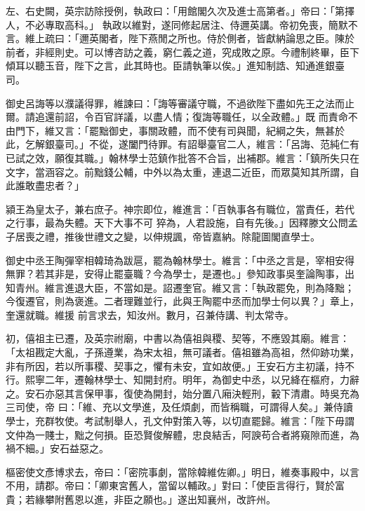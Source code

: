 \begin{pinyinscope}
 左、右史闕，英宗訪除授例，執政曰：「用館閣久次及進士高第者。」帝曰：「第擇人，不必專取高科。」
 執政以維對，遂同修起居注、侍邇英講。帝初免喪，簡默不言。維上疏曰：「邇英閣者，陛下燕閒之所也。侍於側者，皆獻納論思之臣。陳於前者，非經則史。可以博咨訪之義，窮仁義之道，究成敗之原。今禮制終畢，臣下傾耳以聽玉音，陛下之言，此其時也。臣請執筆以俟。」進知制誥、知通進銀臺司。



 御史呂誨等以濮議得罪，維諫曰：「誨等審議守職，不過欲陛下盡如先王之法而止爾。請追還前詔，令百官詳議，以盡人情；復誨等職任，以全政體。」既
 而責命不由門下，維又言：「罷黜御史，事關政體，而不使有司與聞，紀綱之失，無甚於此，乞解銀臺司。」不從，遂闔門待罪。有詔舉臺官二人，維言：「呂誨、范純仁有已試之效，願復其職。」翰林學士范鎮作批答不合旨，出補郡。維言：「鎮所失只在文字，當涵容之。前黜錢公輔，中外以為太重，連退二近臣，而眾莫知其所謂，自此誰敢盡忠者？」



 潁王為皇太子，兼右庶子。神宗即位，維進言：「百執事各有職位，當責任，若代之行事，最為失體。天下大事不可
 猝為，人君設施，自有先後。」因釋滕文公問孟子居喪之禮，推後世禮文之變，以伸規諷，帝皆嘉納。除龍圖閣直學士。



 御史中丞王陶彈宰相韓琦為跋扈，罷為翰林學士。維言：「中丞之言是，宰相安得無罪？若其非是，安得止罷臺職？今為學士，是遷也。」參知政事吳奎論陶事，出知青州。維言進退大臣，不當如是。詔遷奎官。維又言：「執政罷免，則為降黜；今復遷官，則為褒進。二者理難並行，此與王陶罷中丞而加學士何以異？」章上，奎還就職。維援
 前言求去，知汝州。數月，召兼侍講、判太常寺。



 初，僖祖主已遷，及英宗祔廟，中書以為僖祖與稷、契等，不應毀其廟。維言：「太祖戡定大亂，子孫遵業，為宋太祖，無可議者。僖祖雖為高祖，然仰跡功業，非有所因，若以所事稷、契事之，懼有未安，宜如故便。」王安石方主初議，持不行。熙寧二年，遷翰林學士、知開封府。明年，為御史中丞，以兄絳在樞府，力辭之。安石亦惡其言保甲事，復使為開封，始分置八廂決輕刑，轂下清肅。時吳充為三司使，帝
 曰：「維、充以文學進，及任煩劇，而皆稱職，可謂得人矣。」兼侍讀學士，充群牧使。考試制舉人，孔文仲對策入等，以切直罷歸。維言：「陛下毋謂文仲為一賤士，黜之何損。臣恐賢俊解體，忠良結舌，阿諛苟合者將窺隙而進，為禍不細。」安石益惡之。



 樞密使文彥博求去，帝曰：「密院事劇，當除韓維佐卿。」明日，維奏事殿中，以言不用，請郡。帝曰：「卿東宮舊人，當留以輔政。」對曰：「使臣言得行，賢於富貴；若緣攀附舊恩以進，非臣之願也。」遂出知襄州，改許州。




\end{pinyinscope}
